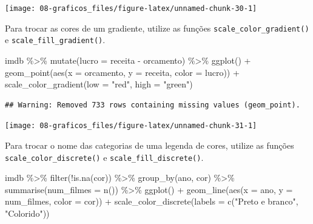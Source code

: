 \documentclass[
]{book}
\newenvironment{Shaded}{\begin{snugshade}}{\end{snugshade}}
\newcommand{\AttributeTok}[1]{\textcolor[rgb]{0.77,0.63,0.00}{#1}}
\newcommand{\FunctionTok}[1]{\textcolor[rgb]{0.00,0.00,0.00}{#1}}
\newcommand{\NormalTok}[1]{#1}
\newcommand{\SpecialCharTok}[1]{\textcolor[rgb]{0.00,0.00,0.00}{#1}}
\newcommand{\StringTok}[1]{\textcolor[rgb]{0.31,0.60,0.02}{#1}}
\begin{document}
\begin{center}\texttt{[image: 08-graficos\_files/figure-latex/unnamed-chunk-30-1]} \end{center}

Para trocar as cores de um gradiente, utilize as funções \texttt{scale\_color\_gradient()} e \texttt{scale\_fill\_gradient()}.

\begin{Shaded}
\begin{Highlighting}[]
\NormalTok{imdb }\SpecialCharTok{\%\textgreater{}\%} 
  \FunctionTok{mutate}\NormalTok{(}\AttributeTok{lucro =}\NormalTok{ receita }\SpecialCharTok{{-}}\NormalTok{ orcamento) }\SpecialCharTok{\%\textgreater{}\%} 
  \FunctionTok{ggplot}\NormalTok{() }\SpecialCharTok{+}
  \FunctionTok{geom\_point}\NormalTok{(}\FunctionTok{aes}\NormalTok{(}\AttributeTok{x =}\NormalTok{ orcamento, }\AttributeTok{y =}\NormalTok{ receita, }\AttributeTok{color =}\NormalTok{ lucro)) }\SpecialCharTok{+}
  \FunctionTok{scale\_color\_gradient}\NormalTok{(}\AttributeTok{low =} \StringTok{"red"}\NormalTok{, }\AttributeTok{high =} \StringTok{"green"}\NormalTok{)}
\end{Highlighting}
\end{Shaded}

\begin{verbatim}
## Warning: Removed 733 rows containing missing values (geom_point).
\end{verbatim}

\begin{center}\texttt{[image: 08-graficos\_files/figure-latex/unnamed-chunk-31-1]} \end{center}

Para trocar o nome das categorias de uma legenda de cores, utilize as funções \texttt{scale\_color\_discrete()} e \texttt{scale\_fill\_discrete()}.

\begin{Shaded}
\begin{Highlighting}[]
\NormalTok{imdb }\SpecialCharTok{\%\textgreater{}\%} 
  \FunctionTok{filter}\NormalTok{(}\SpecialCharTok{!}\FunctionTok{is.na}\NormalTok{(cor)) }\SpecialCharTok{\%\textgreater{}\%} 
  \FunctionTok{group\_by}\NormalTok{(ano, cor) }\SpecialCharTok{\%\textgreater{}\%} 
  \FunctionTok{summarise}\NormalTok{(}\AttributeTok{num\_filmes =} \FunctionTok{n}\NormalTok{()) }\SpecialCharTok{\%\textgreater{}\%} 
  \FunctionTok{ggplot}\NormalTok{() }\SpecialCharTok{+}
  \FunctionTok{geom\_line}\NormalTok{(}\FunctionTok{aes}\NormalTok{(}\AttributeTok{x =}\NormalTok{ ano, }\AttributeTok{y =}\NormalTok{ num\_filmes, }\AttributeTok{color =}\NormalTok{ cor)) }\SpecialCharTok{+}
  \FunctionTok{scale\_color\_discrete}\NormalTok{(}\AttributeTok{labels =} \FunctionTok{c}\NormalTok{(}\StringTok{"Preto e branco"}\NormalTok{, }\StringTok{"Colorido"}\NormalTok{))}
\end{Highlighting}
\end{Shaded}
\end{document}
